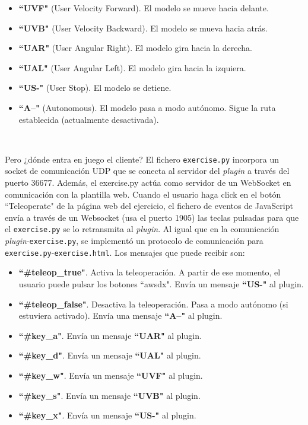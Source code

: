 \begin{itemize}
	\item \textbf{``UVF"} (User Velocity Forward). El modelo se mueve hacia delante.
	\item \textbf{``UVB"} (User Velocity Backward). El modelo se mueva hacia atrás.
	\item \textbf{``UAR"} (User Angular Right). El modelo gira hacia la derecha.
	\item \textbf{``UAL"} (User Angular Left). El modelo gira hacia la izquiera.
	\item \textbf{``US-"} (User Stop). El modelo se detiene.
	\item \textbf{``A--"} (Autonomous). El modelo pasa a modo autónomo. Sigue la ruta establecida (actualmente desactivada).
\end{itemize}\

Pero ¿dónde entra en juego el cliente? El fichero \texttt{exercise.py} incorpora un socket de comunicación UDP que se conecta al servidor del \textit{plugin} a través del puerto 36677. Además, el exercise.py actúa como servidor de un WebSocket en comunicación con la plantilla web. Cuando el usuario haga click en el botón ``Teleoperate" de la página web del ejercicio, el fichero de eventos de JavaScript envía a través de un Websocket (usa el puerto 1905) las teclas pulsadas para que el \texttt{exercise.py} se lo retransmita al \textit{plugin}. Al igual que en la comunicación \textit{plugin}-\texttt{exercise.py}, se implementó un protocolo de comunicación para \texttt{exercise.py}-\texttt{exercise.html}. Los mensajes que puede recibir son:\\

\begin{itemize}
	\item \textbf{``\#teleop\_true"}. Activa la teleoperación. A partir de ese momento, el usuario puede pulsar los botones ``awsdx". Envía un mensaje \textbf{``US-"} al plugin.
	\item \textbf{``\#teleop\_false"}. Desactiva la teleoperación. Pasa a modo autónomo (si estuviera activado). Envía una mensaje \textbf{``A--"} al plugin.
	\item \textbf{``\#key\_a"}. Envía un mensaje \textbf{``UAR"} al plugin.
	\item \textbf{``\#key\_d"}. Envía un mensaje \textbf{``UAL"} al plugin.
	\item \textbf{``\#key\_w"}. Envía un mensaje \textbf{``UVF"} al plugin.
	\item \textbf{``\#key\_s"}. Envía un mensaje \textbf{``UVB"} al plugin.
	\item \textbf{``\#key\_x"}. Envía un mensaje \textbf{``US-"} al plugin.
\end{itemize}\

